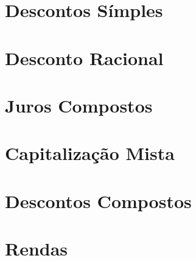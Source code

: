 \section{Descontos Símples}

\section{Desconto Racional}

\section{Juros Compostos}

\section{Capitalização Mista}

\section{Descontos Compostos}

\section{Rendas}



